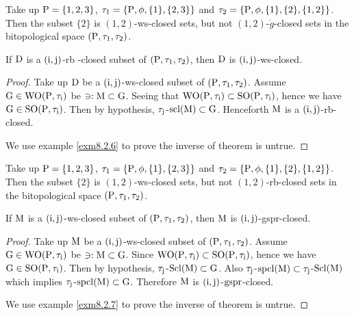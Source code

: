 \begin{exm}\label{exm8.2.5}
Take up $\mathrm{P}= \{1,2,3\}$, $\tau_1 =\{\mathrm{P}, \phi, \{1\}, \{2, 3\}\}$ and $\tau_2 =\{\TSP, \phi, \{1\},\break \{2\}, \{1, 2\}\}$. Then the subset $\{2\}$ is $(1, 2)$-ws-closed sets, but not $(1, 2)$-$\ddot{g}$-closed sets in the bitopological space $(\mathrm{P}, \tau_1, \tau_2 )$.
\end{exm}

\begin{thm}\label{thm8.2.6}
If $\mathrm{D}$ is a $(\mathrm{i}, \mathrm{j})$-rb -closed subset of $(\mathrm{P}, \tau_1, \tau_2 )$, then $\mathrm{D}$ is $(\mathrm{i}, \mathrm{j})$-ws-closed.
\end{thm}

\begin{proof}
Take up $\mathrm{D}$ be a $(\mathrm{i}, \mathrm{j})$-ws-closed subset of $(\mathrm{P}, \tau_1, \tau_2)$. Assume $\mathrm{G}\in\mathrm{W}\mathrm{O}(\mathrm{P}, \tau_{\mathrm{i}})$ be $\ni: \mathrm{M} \subset \mathrm{G}$. Seeing that $\mathrm{W}\mathrm{O}(\mathrm{P}, \tau_{\mathrm{i}} ) \subset \mathrm{S}\mathrm{O}(\mathrm{P}, \tau_{\mathrm{i}})$, hence we have $\mathrm{G}\in\mathrm{S}\mathrm{O}(\mathrm{P}, \tau_{\mathrm{i}})$. Then by hypothesis, $\tau_{\mathrm{j}}$-$\mathrm{scl}(\mathrm{M}) \subset \mathrm{G}$. Henceforth $\mathrm{M}$ is a $(\mathrm{i}, \mathrm{j})$-rb-closed.

We use example \ref{exm8.2.6} to prove the inverse of theorem is untrue.
\end{proof}

\begin{exm}\label{exm8.2.6}
Take up $\mathrm{P}= \{1,2,3\}$, $\tau_1 =\{\mathrm{P}, \phi, \{1\}, \{2, 3\}\}$ and $\tau_2 =\{\TSP, \phi, \{1\},\break \{2\}, \{1, 2\}\}$. Then the subset $\{2\}$ is $(1, 2)$-ws-closed sets, but not $(1, 2)$-rb-closed sets in the bitopological space $(\mathrm{P}, \tau_1, \tau_2 )$.
\end{exm}

\begin{thm}\label{thm8.2.7}
If $\mathrm{M}$ is a $(\mathrm{i}, \mathrm{j})$-ws-closed subset of $(\mathrm{P}, \tau_1, \tau_2 )$, then $\mathrm{M}$ is $(\mathrm{i}, \mathrm{j})$-gspr-closed.
\end{thm}

\begin{proof}
Take up $\mathrm{M}$ be a $(\mathrm{i}, \mathrm{j})$-ws-closed subset of $(\mathrm{P}, \tau_1, \tau_2 )$. Assume $\mathrm{G}\in\mathrm{W}\mathrm{O}(\mathrm{P}, \tau_{\mathrm{i}} )$ be $\ni: \mathrm{M} \subset \mathrm{G}$. Since $\mathrm{W}\mathrm{O}(\mathrm{P}, \tau_{\mathrm{i}} ) \subset \mathrm{S}\mathrm{O}(\mathrm{P}, \tau_{\mathrm{i}} )$, hence we have $\mathrm{G}\in\mathrm{S}\mathrm{O}(\mathrm{P}, \tau_{\mathrm{i}} )$. Then by hypothesis, $\tau_{\mathrm{j}}$-$\mathrm{Scl}(\mathrm{M}) \subset \mathrm{G}$. Also $\tau_{\mathrm{j}}$-$\mathrm{spcl}(\mathrm{M}) \subset \tau_{\mathrm{j}}$-$\mathrm{Scl}(\mathrm{M})$ which implies $\tau_{\mathrm{j}}$-$\mathrm{spcl}(\mathrm{M})\subset \mathrm{G}$. Therefore $\mathrm{M}$ is $(\mathrm{i}, \mathrm{j})$-$\mathrm{gspr}$-closed.

We use example \ref{exm8.2.7} to prove the inverse of theorem is untrue.
\end{proof}


